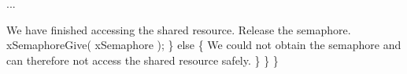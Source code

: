 \begin{DoxyPre}...\end{DoxyPre}



\begin{DoxyPre}We have finished accessing the shared resource.  Release the 
semaphore.
            xSemaphoreGive( xSemaphore );
        \}
        else
        \{
We could not obtain the semaphore and can therefore not access
the shared resource safely.
        \}
    \}
 \}
 \end{DoxyPre}
 
